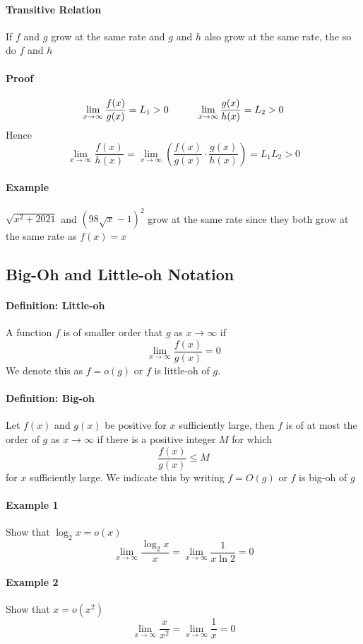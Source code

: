 \documentclass[12pt]{article}
\newcommand\tab[1][1cm]{\hspace*{#1}}
\begin{document}
\paragraph{Transitive Relation} If $f$ and $g$ grow at the same rate and $g$ and $h$ also grow at the same rate, the so do $f$ and $h$
\paragraph{Proof}
\[
    \lim_{x \to \infty} \frac{f(x)}{g(x)} = L_1 > 0 \textrm{\tab} \lim_{x \to \infty} \frac{g(x)}{h(x)} = L_2 > 0 
\]
Hence
\[
    \lim_{x \to \infty} \frac{f(x)}{h(x)} = \lim_{x \to \infty} \left( \frac{f(x)}{g(x)} \cdot \frac{g(x)}{h(x)}  \right) = L_1 L_2 > 0
\]

\paragraph{Example} $\sqrt{x^2 + 2021}$ and $(98 \sqrt{x} - 1)^2$ grow at the same rate since they both grow at the same rate as $f(x) = x$
\subsection{Big-Oh and  Little-oh Notation}
\paragraph{Definition: Little-oh} A function $f$ is of smaller order that $g$ as $x \to \infty$ if
\[
    \lim_{x \to \infty} \frac{f(x)}{g(x)} = 0 
\]
We denote this as $f = o(g)$ or $f$ is little-oh of $g$.

\paragraph{Definition: Big-oh} Let $f(x)$ and $g(x)$ be positive for $x$ sufficiently large, then $f$ is of at most the order of $g$ as $x \to \infty$ if there is a positive integer $M$ for which
\[
    \frac{f(x)}{g(x)} \leq M 
\]
for $x$ sufficiently large. We indicate this by writing $f = O(g)$ or $f$ is big-oh of $g$

\paragraph{Example 1} Show that $\log_2 x = o(x)$
\[
    \lim_{x \to \infty} \frac{\log_2 x}{x} = \lim_{x \to \infty} \frac{1}{x \ln 2}   = 0 
\]

\paragraph{Example 2} Show that $x = o(x^2)$
\[
    \lim_{x \to \infty} \frac{x}{x^2} = \lim_{x \to \infty} \frac{1}{x} = 0
\]
\end{document}
